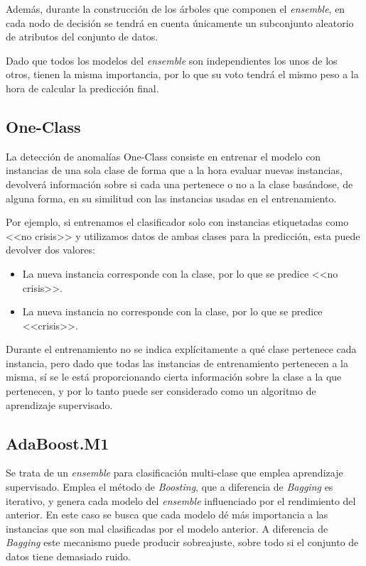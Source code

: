 Además, durante la construcción de los árboles que componen el \textit{ensemble}, en cada nodo de decisión se tendrá en cuenta únicamente un subconjunto aleatorio de atributos del conjunto de datos.

Dado que todos los modelos del \textit{ensemble} son independientes los unos de los otros, tienen la misma importancia, por lo que su voto tendrá el mismo peso a la hora de calcular la predicción final. 

\subsection{One-Class}

La detección de anomalías One-Class consiste en entrenar el modelo con instancias de una sola clase de forma que a la hora evaluar nuevas instancias, devolverá información sobre si cada una pertenece o no a la clase basándose, de alguna forma, en su similitud con las instancias usadas en el entrenamiento. 

Por ejemplo, si entrenamos el clasificador solo con instancias etiquetadas como <<no crisis>> y utilizamos datos de ambas clases para la predicción, esta puede devolver dos valores: 

\begin{itemize}
	\item La nueva instancia corresponde con la clase, por lo que se predice <<no crisis>>. 
	\item La nueva instancia no corresponde con la clase, por lo que se predice <<crisis>>. 
\end{itemize}

Durante el entrenamiento no se indica explícitamente a qué clase pertenece cada instancia, pero dado que todas las instancias de entrenamiento pertenecen a la misma, sí se le está proporcionando cierta información sobre la clase a la que pertenecen, y por lo tanto puede ser considerado como un algoritmo de aprendizaje supervisado. 

\subsection{AdaBoost.M1}

Se trata de un \textit{ensemble} para clasificación multi-clase que emplea aprendizaje supervisado. Emplea el método de \textit{Boosting}, que a diferencia de \textit{Bagging} es iterativo, y genera cada modelo del \textit{ensemble} influenciado por el rendimiento del anterior. En este caso se busca que cada modelo dé más importancia a las instancias que son mal clasificadas por el modelo anterior. A diferencia de \textit{Bagging} este mecanismo puede producir sobreajuste, sobre todo si el conjunto de datos tiene demasiado ruido. 

